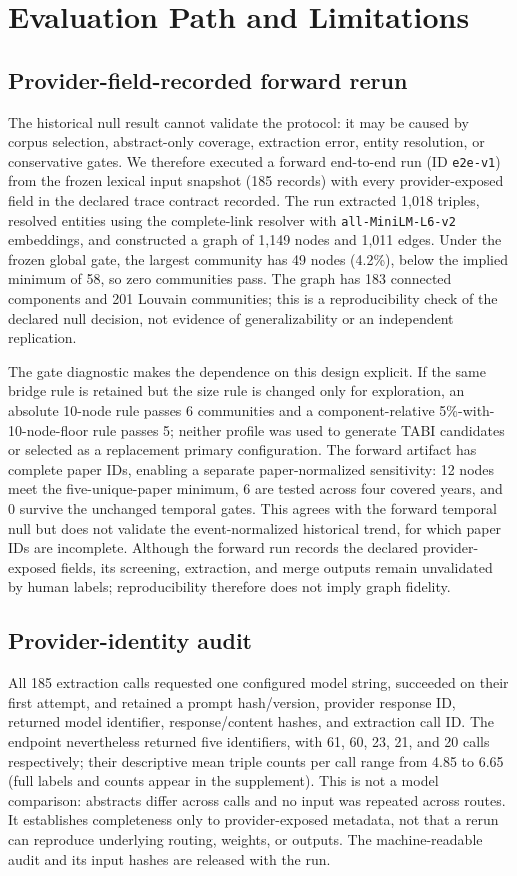 \documentclass[runningheads]{llncs}
\begin{document}
\section{Evaluation Path and Limitations}

\subsection{Provider-field-recorded forward rerun}
The historical null result cannot validate the protocol: it may be caused by corpus selection, abstract-only coverage, extraction error, entity resolution, or conservative gates. We therefore executed a forward end-to-end run (ID \texttt{e2e-v1}) from the frozen lexical input snapshot (185 records) with every provider-exposed field in the declared trace contract recorded. The run extracted 1,018 triples, resolved entities using the complete-link resolver with \texttt{all-MiniLM-L6-v2} embeddings, and constructed a graph of 1,149 nodes and 1,011 edges. Under the frozen global gate, the largest community has 49 nodes (4.2\%), below the implied minimum of 58, so zero communities pass. The graph has 183 connected components and 201 Louvain communities; this is a reproducibility check of the declared null decision, not evidence of generalizability or an independent replication.

The gate diagnostic makes the dependence on this design explicit. If the same bridge rule is retained but the size rule is changed only for exploration, an absolute 10-node rule passes 6 communities and a component-relative 5\%-with-10-node-floor rule passes 5; neither profile was used to generate TABI candidates or selected as a replacement primary configuration. The forward artifact has complete paper IDs, enabling a separate paper-normalized sensitivity: 12 nodes meet the five-unique-paper minimum, 6 are tested across four covered years, and 0 survive the unchanged temporal gates. This agrees with the forward temporal null but does not validate the event-normalized historical trend, for which paper IDs are incomplete. Although the forward run records the declared provider-exposed fields, its screening, extraction, and merge outputs remain unvalidated by human labels; reproducibility therefore does not imply graph fidelity.

\subsection{Provider-identity audit}
All 185 extraction calls requested one configured model string, succeeded on their first attempt, and retained a prompt hash/version, provider response ID, returned model identifier, response/content hashes, and extraction call ID. The endpoint nevertheless returned five identifiers, with 61, 60, 23, 21, and 20 calls respectively; their descriptive mean triple counts per call range from 4.85 to 6.65 (full labels and counts appear in the supplement). This is not a model comparison: abstracts differ across calls and no input was repeated across routes. It establishes completeness only to provider-exposed metadata, not that a rerun can reproduce underlying routing, weights, or outputs. The machine-readable audit and its input hashes are released with the run.
\end{document}

